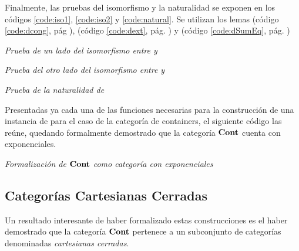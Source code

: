 
Finalmente, las pruebas del isomorfismo y la naturalidad se exponen en los códigos \ref{code:iso1}, \ref{code:iso2} y \ref{code:natural}. Se utilizan los lemas  (código \ref{code:dcong}, pág \pageref{code:dcong}),  (código \ref{code:dext}, pág. \pageref{code:dext}) y  (código \ref{code:dSumEq}, pág. \pageref{code:dSumEq})

\begin{agdacode}{\it Prueba de un lado del isomorfismo entre \AgdaFunction{$\curry{\_}$} y \AgdaFunction{$\uncurry{\_}$} } \label{code:iso1}

\end{agdacode}

\begin{agdacode}{\it Prueba del otro lado del isomorfismo entre \AgdaFunction{$\curry{\_}$} y \AgdaFunction{$\uncurry{\_}$}} \label{code:iso2}

\end{agdacode}
  
\begin{agdacode}{\it Prueba de la naturalidad de \AgdaFunction{$\curry{\_}$}}\label{code:natural}
      
\end{agdacode}

Presentadas ya cada una de las funciones necesarias para la construcción de una instancia de  para el caso de la categoría de containers, el siguiente código las reúne, quedando formalmente demostrado que la categoría $\mathbf{Cont}$ cuenta con exponenciales.

\begin{agdacode}{\it Formalización de $\mathbf{Cont}$ como categoría con exponenciales}\label{code:setHasExponentials}

\end{agdacode}


\subsection{Categorías Cartesianas Cerradas}\label{cons:ccc}

Un resultado interesante de haber formalizado estas construcciones es el haber demostrado que la categoría $\mathbf{Cont}$ pertenece a un subconjunto de categorías denominadas {\it cartesianas cerradas}.

